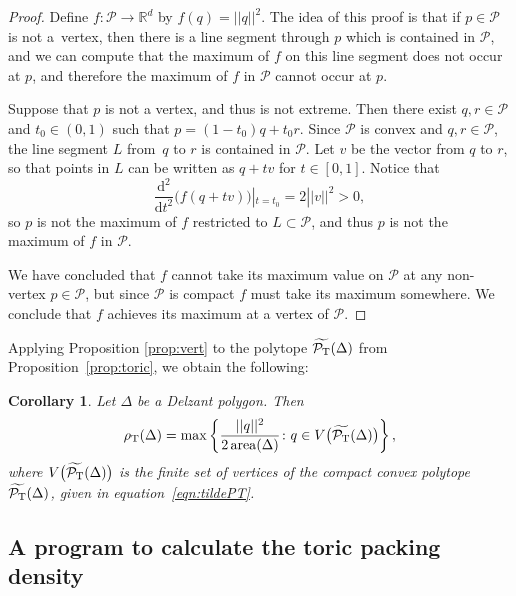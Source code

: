 \documentclass[pdftex]{sigma}
\numberwithin{equation}{section}
\newtheorem{Corollary}[Theorem]{Corollary}
\def\R{{\mathbb R}}
\newcommand{\De}{\Delta}
\newcommand{\area}{\operatorname{area}}
\newcommand{\PT}{\mathcal{P}_{\rm T}}
\newcommand{\PTtilde}{\widetilde{\PT}}
\begin{document}
\begin{proof}
 Define $f\colon \mathcal{P}\to \R^d$ by $f(q) = ||q||^2$.
 The idea of this proof is that if $p\in\mathcal{P}$ is not a~vertex, then there is a line segment through $p$ which is contained in $\mathcal{P}$, and we can compute that the maximum of $f$ on this line segment does not occur at $p$, and therefore the maximum of $f$ in $\mathcal{P}$ cannot occur at $p$.

 Suppose that $p$ is not a vertex, and thus is not extreme. Then
 there exist $q,r \in \mathcal{P}$ and $t_0 \in (0,1)$ such that $p = (1-t_0)q +t_0r$. Since $\mathcal{P}$ is convex and $q,r \in \mathcal{P}$, the line segment $L$ from~$q$ to $r$ is contained in $\mathcal{P}$.
 Let $v$ be the vector from $q$ to $r$, so that points in $L$ can be written as $q+tv$ for $t\in[0,1]$.
 Notice that
 \[
 \frac{\mathrm{d}^2}{\mathrm{d}t^2}\big( f(q+tv)\big)|_{t=t_0} = 2||v||^2>0,
\]
 so $p$ is not the maximum of $f$ restricted to $L\subset \mathcal{P}$, and thus $p$ is not the maximum of $f$ in $\mathcal{P}$.




 We have concluded that $f$ cannot take its maximum value on $\mathcal{P}$ at any non-vertex $p\in\mathcal{P}$, but since $\mathcal{P}$ is compact $f$ must take its maximum somewhere. We conclude that $f$ achieves its maximum at a vertex of $\mathcal{P}$.
 \end{proof}


Applying Proposition \ref{prop:vert} to the polytope
$\PTtilde(\Delta)$ from Proposition~\ref{prop:toric},
we obtain the following:
\begin{Corollary}
 \label{cor:toric-vertex}
 Let $\De$ be a Delzant polygon.
 Then
 \[
 \rho_{{\rm T}} (\De) = \max \left\{ \frac{||q||^2}{2 \area(\De)}\colon  q\in V\big(\PTtilde(\De)\big)\right\},
 \]
 where $V\big(\PTtilde(\De)\big)$ is the finite set of vertices of the compact convex polytope $\PTtilde(\De)$, given in equation~\eqref{eqn:tildePT}.
 \end{Corollary}


 \subsection{A program to calculate the toric packing density}
\label{sec:program}
\end{document}
